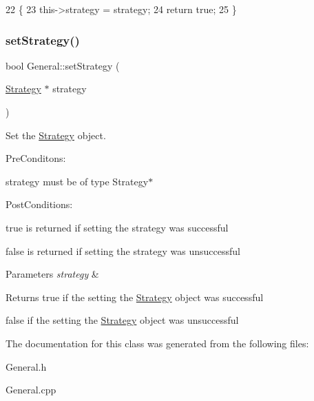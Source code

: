 \begin{DoxyCode}
22                                            \{
23     this->strategy = strategy;
24     \textcolor{keywordflow}{return} \textcolor{keyword}{true};
25 \}
\end{DoxyCode}
\mbox{\label{classGeneral_abe8dcb93ddb9b79bd8e75e8c642758ba}} 
\subsubsection{\texorpdfstring{set\+Strategy()}{setStrategy()}}
{\footnotesize\ttfamily bool General\+::set\+Strategy (\begin{DoxyParamCaption}\item[{\hyperlink{classStrategy}{Strategy} $\ast$}]{strategy }\end{DoxyParamCaption})}



Set the \hyperlink{classStrategy}{Strategy} object. 

Pre\+Conditons\+:
\begin{DoxyItemize}
\item strategy must be of type Strategy$\ast$
\end{DoxyItemize}

Post\+Conditions\+:
\begin{DoxyItemize}
\item true is returned if setting the strategy was successful
\item false is returned if setting the strategy was unsuccessful
\end{DoxyItemize}


\begin{DoxyParams}{Parameters}
{\em strategy} & \\
\hline
\end{DoxyParams}
\begin{DoxyReturn}{Returns}
true if the setting the \hyperlink{classStrategy}{Strategy} object was successful 

false if the setting the \hyperlink{classStrategy}{Strategy} object was unsuccessful 
\end{DoxyReturn}


The documentation for this class was generated from the following files\+:\begin{DoxyCompactItemize}
\item 
General.\+h\item 
General.\+cpp\end{DoxyCompactItemize}
